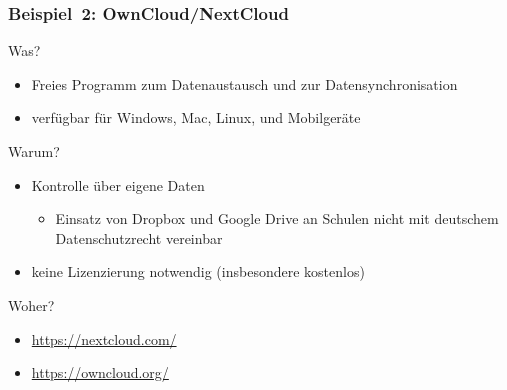 \documentclass{beamer}
\begin{document}
\begin{frame}
  \frametitle{Beispiel~2: OwnCloud/NextCloud}

  \onslide<+->

  \begin{block}{Was?}
    \begin{itemize}
    \item Freies Programm zum Datenaustausch und zur Datensynchronisation
    \item verfügbar für Windows, Mac, Linux, und Mobilgeräte
    \end{itemize}
  \end{block}

  \onslide<+->

  \begin{block}{Warum?}
    \begin{itemize}
    \item Kontrolle über eigene Daten
      \begin{itemize}
      \item Einsatz von Dropbox und Google Drive an Schulen nicht mit
        deutschem Datenschutzrecht vereinbar
      \end{itemize}
    \item keine Lizenzierung notwendig (insbesondere kostenlos)
    \end{itemize}
  \end{block}

  \onslide<+->

  \begin{block}{Woher?}
    \begin{itemize}
    \item \url{https://nextcloud.com/}
    \item \url{https://owncloud.org/}
    \end{itemize}
  \end{block}


\end{frame}
\end{document}
